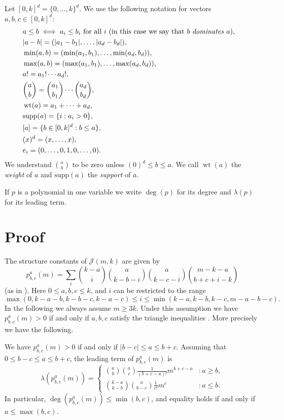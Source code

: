 \documentclass[ALCO]{cedram}
\newcommand{\cJ}{{\mathcal J}}
\newcommand{\lt}{\lambda}
\newcommand{\wt}{\operatorname{wt}}
\newcommand{\supp}{\mathrm{supp}}
\begin{document}
Let $[0,k]^d = \{0,\dots,k\}^d$.
We use the following notation for vectors $a,b,c \in [0,k]^d$:
\begin{align*}
    &a \leq b \iff a_i \leq b_i ~ \text{for all} ~ i ~ {(\text{in this case we say that } b ~ \text{\emph{dominates}} ~ a)}, &\\
    &|a - b| = (|a_1 - b_1|, \dots, |a_d - b_d|),\\
    &\min(a, b) = (\min(a_1, b_1), \dots, \min(a_d, b_d)),\\
    &\max(a, b) = (\max(a_1, b_1), \dots, \max(a_d, b_d)),\\
    &a! = a_1! \cdots a_d!,\\
    &\binom{a}{b} = \binom{a_1}{b_1} \cdots \binom{a_d}{b_d},\\
    &\wt(a) = a_1 + \cdots + a_d, \\
    &\supp(a) = \{ i : a_i > 0\}, \\
    &[a] = \{ b \in [0,k]^d : b \leq a\}, \\
    &(x)^d = (x, \dots, x), \\
    &e_i = (0, \dots, 0, 1, 0, \dots, 0).
\end{align*}
We understand $\binom{a}{b}$ to be zero unless $(0)^d \le b \le a$.
We call $\wt(a)$ the \emph{weight} of $a$ and $\supp(a)$ the \emph{support} of $a$.

If $p$ is a polynomial in one variable we write $\deg(p)$ for its degree and $\lt(p)$ for its leading term.

\section{Proof}

The structure constants of $\cJ(m,k)$ are given by
\[
    p_{b,c}^a(m) = \sum_{i} \binom{k-a}{i}\binom{a}{k-b-i}\binom{a}{k-c-i} \binom{m-k-a}{b+c+i-k}
\]
(as in \cite{E,KK}).
Here $0 \leq a, b, c \leq k$, and $i$ can be restricted to the range
\[
    \max(0,k-a-b,k-b-c,k-a-c) \leq i \leq \min(k-a,k-b,k-c, m-a-b-c).
\]
In the following we always assume $m \geq 3k$. Under this assumption we have $p_{b,c}^a(m) > 0$ if and only if $a,b,c$ satisfy the triangle inequalities \cite[Lemma~4.1]{E}.
More precisely we have the following.

\begin{lemma}
    We have $p^a_{b, c}(m) > 0$ if and only if $|b - c| \leq a \leq b + c$. 
    Assuming that~$0 \leq b - c \leq a \leq b + c$, the leading term of $p^a_{b,c}(m)$ is
    \[
        \lt(p_{b,c}^a(m)) = \begin{cases}
        \binom{a}{b}\binom{a}{c}\frac{1}{(b+c - a)!} m^{b+c-a} &: a \geq b,\\
        \binom{k-a}{k-b}\binom{a}{b-c}\frac{1}{c!} m^{c} &: a\leq b.
        \end{cases}
    \]
In particular, $\deg(p_{b,c}^a(m))\leq \min(b,c)$, and equality holds if and only if $a \leq \max(b,c)$.
\end{lemma}
\end{document}
